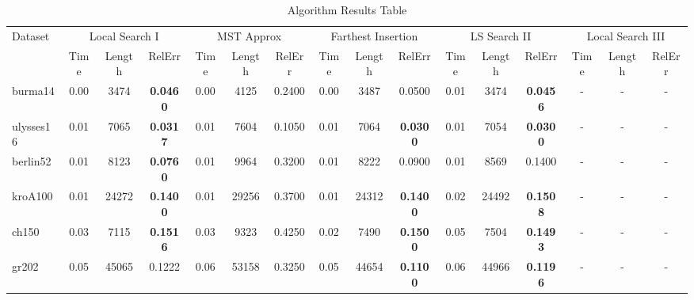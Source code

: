 \documentclass[twoside,11pt]{article}
\begin{document}
\begin{table}[!htbp]
\caption{Algorithm Results Table}
\tabcolsep=0.11cm
\begin{tabular}{lccccccccccccccc}
\toprule
\multirow{2}[3]{*}{Dataset} & \multicolumn{3}{c}{Local Search I} & \multicolumn{3}{c}{MST Approx}  & \multicolumn{3}{c}{Farthest Insertion}  & \multicolumn{3}{c}{LS Search II}& \multicolumn{3}{c}{Local Search III}\\
\cmidrule(lr){2-4} \cmidrule(lr){5-7} \cmidrule(lr){8-10} \cmidrule(lr){11-13} \cmidrule(lr){14-16}
 & Time & Length & RelErr & Time & Length & RelErr & Time & Length & RelErr & Time & Length & RelErr & Time & Length & RelErr\\
\midrule
burma14 & 0.00 & 3474 & \bf 0.0460 & 0.00 & 4125 & 0.2400 & 0.00 & 3487 & 0.0500 & 0.01 & 3474 & \bf 0.0456 & - & - & - \\
ulysses16 & 0.01 & 7065 & \bf 0.0317 & 0.01 & 7604 & 0.1050 & 0.01 & 7064 & \bf 0.0300 & 0.01 & 7054 & \bf 0.0300 & - & - & - \\
berlin52  & 0.01 & 8123 & \bf 0.0760 & 0.01 & 9964 & 0.3200 & 0.01 & 8222 & 0.0900 & 0.01 & 8569 & 0.1400 & - & - & - \\
kroA100  & 0.01 & 24272 & \bf 0.1400 & 0.01 & 29256 & 0.3700 & 0.01 & 24312 & \bf 0.1400 & 0.02 & 24492 & \bf 0.1508 & - & - & - \\
ch150  & 0.03 &  7115 & \bf 0.1516 & 0.03 & 9323 & 0.4250 & 0.02 & 7490 & \bf 0.1500 & 0.05 & 7504 & \bf 0.1493 & - & - & - \\
gr202 & 0.05 &  45065 & 0.1222 & 0.06 & 53158 & 0.3250 & 0.05 & 44654 & \bf 0.1100 & 0.06 & 44966 & \bf 0.1196 & - & - & - \\
\bottomrule
\end{tabular}
\end{table}
\end{document}
